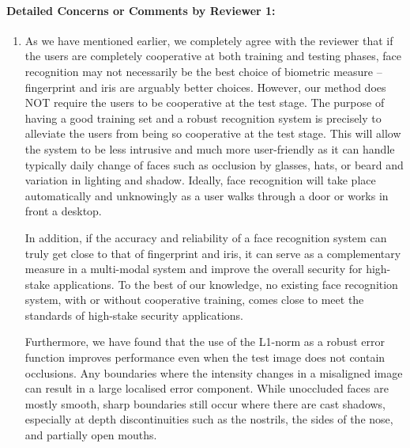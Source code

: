 \documentclass[11pt]{article}
\begin{document}
\paragraph{Detailed Concerns or Comments by Reviewer 1:} \begin{enumerate}
\item As we have mentioned earlier, we completely agree with the reviewer that
if the users are completely cooperative at both training and testing phases,
face recognition may not necessarily be the best choice of biometric measure --
fingerprint and iris are arguably better choices. However, our method does NOT
require the users to be cooperative at the test stage. The purpose of having a
good training set and a robust recognition system is precisely to alleviate the
users from being so cooperative at the test stage. This will allow the system
to be less intrusive and much more user-friendly as it can handle typically
daily change of faces such as occlusion by glasses, hats, or beard and
variation in lighting and shadow. Ideally, face recognition will take place
automatically and unknowingly as a user walks through a door or works in front
a desktop.

In addition, if the accuracy and reliability of a face recognition system can
truly get close to that of fingerprint and iris, it can serve as a
complementary measure in a multi-modal system and improve the overall security
for high-stake applications. To the best of our knowledge, no existing face
recognition system, with or without cooperative training, comes close to meet
the standards of high-stake security applications. 

Furthermore, we have found that the use of the L1-norm as a robust error
function improves performance even when the test image does not contain
occlusions.  Any boundaries where the intensity changes in a misaligned image
can result in a large localised error component.  While unoccluded faces are
mostly smooth, sharp boundaries still occur where there are cast shadows,
especially at depth discontinuities such as the nostrils, the sides of the
nose, and partially open mouths.  



\end{enumerate}
\end{document}
